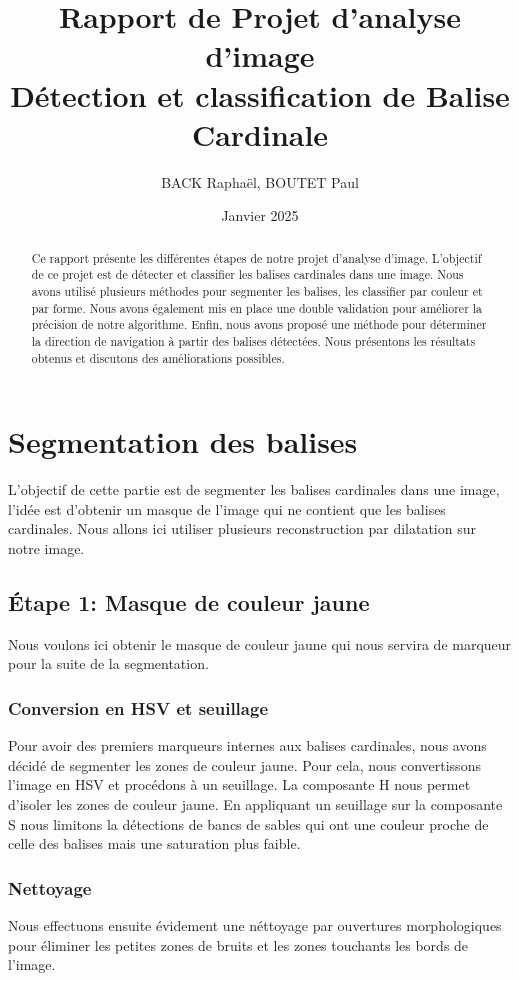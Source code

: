 \documentclass{article}
\title{Rapport de Projet d'analyse d'image\\ Détection et classification de Balise Cardinale}
\author{BACK Raphaël, BOUTET Paul}
\date{Janvier 2025}
\begin{document}
\maketitle

\begin{abstract}
    Ce rapport présente les différentes étapes de notre projet d'analyse d'image. L'objectif de ce projet est de détecter et classifier les balises cardinales dans une image. Nous avons utilisé plusieurs méthodes pour segmenter les balises, les classifier par couleur et par forme. Nous avons également mis en place une double validation pour améliorer la précision de notre algorithme. Enfin, nous avons proposé une méthode pour déterminer la direction de navigation à partir des balises détectées. Nous présentons les résultats obtenus et discutons des améliorations possibles.
\end{abstract}

\section{Segmentation des balises}

L'objectif de cette partie est de segmenter les balises cardinales dans une
image, l'idée est d'obtenir un masque de l'image qui ne contient que les
balises cardinales. Nous allons ici utiliser plusieurs reconstruction par
dilatation sur notre image.

\subsection{Étape 1: Masque de couleur jaune}

Nous voulons ici obtenir le masque de couleur jaune qui nous servira de
marqueur pour la suite de la segmentation.

\subsubsection{Conversion en HSV et seuillage}
Pour avoir des premiers marqueurs internes aux balises cardinales, nous avons
décidé de segmenter les zones de couleur jaune. Pour cela, nous convertissons
l'image en HSV et procédons à un seuillage. La composante H nous permet
d'isoler les zones de couleur jaune. En appliquant un seuillage sur la
composante S nous limitons la détections de bancs de sables qui ont une couleur
proche de celle des balises mais une saturation plus faible.

\subsubsection{Nettoyage}
Nous effectuons ensuite évidement une néttoyage par ouvertures morphologiques
pour éliminer les petites zones de bruits et les zones touchants les bords de
l'image.
\end{document}
